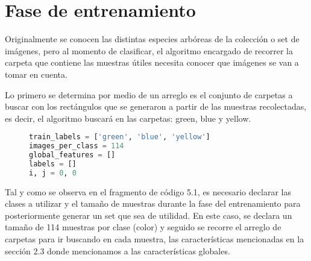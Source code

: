\section{Fase de entrenamiento}
Originalmente se conocen las distintas especies arbóreas de la colección o set de imágenes, pero al momento de clasificar, el algoritmo encargado de recorrer la carpeta que contiene las muestras útiles  necesita conocer que imágenes se van a tomar en cuenta. 

Lo primero se determina por medio de un arreglo es el conjunto de carpetas a buscar con los rectángulos que se generaron a partir de las muestras recolectadas, es decir, el algoritmo buscará en las carpetas: green, blue y yellow. 

\begin{figure}[H]
\centering
\begin{lstlisting}[basicstyle=\small, language=Python, caption=Código para entrenar modelo]
train_labels = ['green', 'blue', 'yellow']
images_per_class = 114 
global_features = []
labels = []
i, j = 0, 0
\end{lstlisting}
\label{Declaracion-variables}
\end{figure}


Tal y como se observa en el fragmento de código 5.1, es necesario declarar las clases a utilizar y el tamaño de muestras durante la fase del entrenamiento para posteriormente generar un set que sea de utilidad. En este caso, se declara un tamaño de 114 muestras por clase (color) y seguido se recorre el arreglo de carpetas para ir buscando en cada muestra, las características mencionadas en la sección 2.3 donde mencionamos a las características globales.


